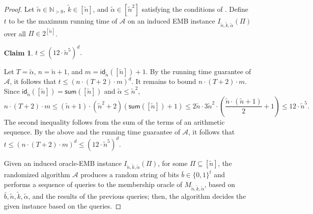 \documentclass[11pt,letter]{article}
\newcommand{\cA}{{\mathcal{A}}}
\newtheorem{claim}[lemma]{Claim}
\begin{document}
\begin{proof}
		
		Let $\tilde{n} \in \mathbb{N}_{>0}$, $\tilde{k} \in \left[\tilde{n}\right]$, and $\tilde{\alpha} \in \left[\tilde{n}^2\right]$  satisfying the conditions of . Define $t$ to be the maximum running time of $\cA$ on an induced EMB instance $I_{\tilde{n},\tilde{k},\tilde{\alpha}}(\Pi)$ over all $\Pi \in 2^{\left[ \tilde{n}\right]}$. 
			\begin{claim}
			\label{claim:H2}
			$t \leq	\left(	12 \cdot \tilde{n}^5 \right)^{d}$.    
		\end{claim}
		\begin{claimproof}
				Let $T = \tilde{\alpha}$, $n = \tilde{n}+1$, and $m = \textsf{id}_{\tilde{n}}(\left[\tilde{n}\right])+1$. By the running time guarantee of $\cA$, it follows that $t \leq	\left(	n \cdot (T+2) \cdot m \right)^{d}$. It remains to bound $n \cdot (T+2) \cdot m$. Since $\textsf{id}_{\tilde{n}}(\left[\tilde{n}\right]) = \textsf{sum}(\left[\tilde{n}\right])$ and $\tilde{\alpha} \leq \tilde{n}^2$, %
				 \begin{equation*}
				\label{eq:InducedParameters}
				n  \cdot (T+2) \cdot m \leq	 \left(\tilde{n}+1\right) \cdot \left( \tilde{n}^2+2\right)\left( \textsf{sum}( \left[\tilde{n} \right])+1 \right) \leq 2 \tilde{n} \cdot 3 \tilde{n}^2 \cdot \left(\frac{\tilde{n} \cdot (\tilde{n}+1)}{2}+1 \right) \leq 12 \cdot \tilde{n}^5. 
			\end{equation*}  The second inequality follows from the sum of the terms of an arithmetic sequence. By the above and the running time guarantee of $\cA$, it follows that $t \leq	\left(	n \cdot (T+2) \cdot m \right)^{d} \leq 	\left(	12 \cdot \tilde{n}^5 \right)^{d}$.   
		\end{claimproof}
		
	Given  an induced oracle-EMB instance $I_{\tilde{n},\tilde{k},\tilde{\alpha}}(\Pi)$, for some $\Pi \subseteq \left[ \tilde{n}\right]$,  the randomized algorithm $\cA$ produces a random string of bits $\bar{b} \in \{0,1\}^{t}$ and performs a sequence of queries to the membership oracle of $M_{\tilde{n},\tilde{k},\tilde{\alpha}}$, based on $\bar{b},\tilde{n},\tilde{k},\tilde{\alpha}$, and the results of the previous queries; then, the algorithm decides the given instance based on the queries. 
		 

\end{proof}
\end{document}
